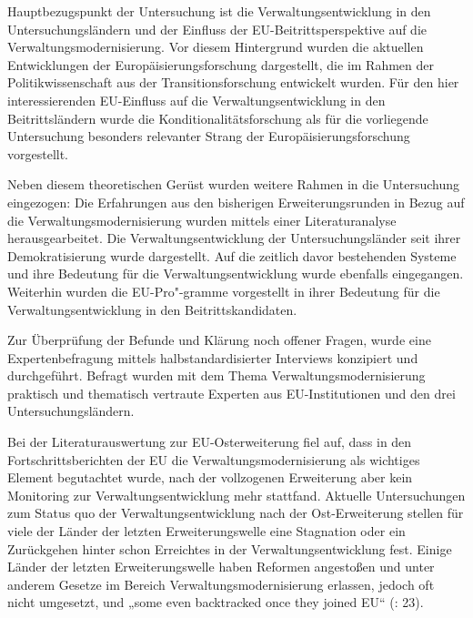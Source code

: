 Hauptbezugspunkt der Untersuchung ist die Verwaltungsentwicklung in den Untersuchungsländern und der Einfluss der EU-Beitrittsperspektive auf die Verwaltungsmodernisierung. Vor diesem Hintergrund wurden die aktuellen Entwicklungen der Europäisierungsforschung dargestellt, die im Rahmen der Politikwissenschaft aus der Transitionsforschung entwickelt wurden. Für den hier interessierenden EU-Einfluss auf die Verwaltungsentwicklung in den Beitrittsländern wurde die Konditionalitätsforschung als für die vorliegende Untersuchung besonders relevanter Strang der Europäisierungsforschung vorgestellt.\par
Neben diesem theoretischen Gerüst wurden weitere Rahmen in die Untersuchung eingezogen: Die Erfahrungen aus den bisherigen Erweiterungsrunden in Bezug auf die Verwaltungsmodernisierung wurden mittels einer Literaturanalyse herausgearbeitet. Die Verwaltungsentwicklung der Untersuchungsländer seit ihrer Demokratisierung wurde dargestellt. Auf die zeitlich davor bestehenden Systeme und ihre Bedeutung für die Verwaltungsentwicklung wurde ebenfalls eingegangen. Weiterhin wurden die EU-Pro"-gramme vorgestellt in ihrer Bedeutung für die Verwaltungsentwicklung in den Beitrittskandidaten.\par
Zur Überprüfung der Befunde und Klärung noch offener Fragen, wurde eine Expertenbefragung mittels halbstandardisierter Interviews konzipiert und durchgeführt. Befragt wurden mit dem Thema Verwaltungsmodernisierung praktisch und thematisch vertraute Experten aus EU-Institutionen und den drei Untersuchungsländern.\par
Bei der Literaturauswertung zur EU-Osterweiterung fiel auf, dass in den Fortschrittsberichten der EU die Verwaltungsmodernisierung als wichtiges Element begutachtet wurde, nach der vollzogenen Erweiterung aber kein Monitoring zur Verwaltungsentwicklung mehr stattfand.
Aktuelle Untersuchungen zum Status quo der Verwaltungsentwicklung nach der Ost-Erweiterung stellen für viele der Länder der letzten Erweiterungswelle eine Stagnation oder ein Zurückgehen hinter schon Erreichtes in der Verwaltungsentwicklung fest. Einige Länder der letzten Erweiterungswelle haben Reformen angestoßen und unter anderem Gesetze im Bereich Verwaltungsmodernisierung erlassen, jedoch oft nicht umgesetzt, und „some even backtracked once they joined EU“ (\cite{pickering}: 23).\par
